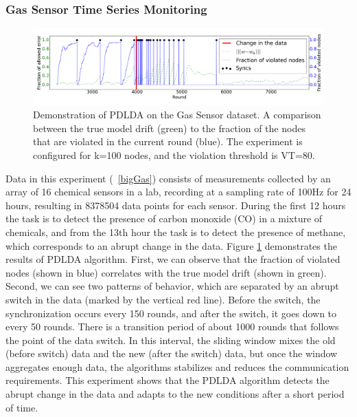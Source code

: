 \documentclass{vldb}
\begin{document}
\subsubsection{Gas Sensor Time Series Monitoring}
\begin{figure}[ht]
\centering
\includegraphics[width=\textwidth]{graphics/overTime100k.png}
\caption{Demonstration of PDLDA on the Gas Sensor dataset.
A comparison between the true model drift (green) to the fraction of the nodes that
are violated in the current round (blue).
The experiment is configured for k=100 nodes, and the violation threshold is
VT=80.}
\label{BigGasOverTime}
\end{figure}
Data in this experiment (~\ref{bigGas}) consists of measurements collected
by an array of 16 chemical sensors in a lab, recording at a sampling
rate of 100Hz for 24 hours, resulting in 8378504 data points for each sensor.
During the first 12 hours the task is to detect the presence of carbon monoxide
(CO) in a mixture of chemicals, and from the 13th hour the task is to detect the presence of methane, 
which corresponds to an abrupt change in the data.
Figure \ref{BigGasOverTime} demonstrates the results of PDLDA algorithm.
First, we can observe that the fraction of violated nodes (shown in blue) correlates with the true model drift (shown in green). Second, we can see two patterns of behavior, which are separated by an abrupt switch in the data  (marked by the vertical red line). Before the switch,  the synchronization occurs every 150 rounds, and after the switch, it goes down to every 50 rounds. There is a transition period of about 1000 rounds that follows the point of the data switch. In this interval, the sliding window mixes the old (before switch) data and the new (after the switch) data, but once the window aggregates enough data, the algorithms stabilizes and reduces the communication requirements.   This experiment shows that the PDLDA algorithm detects the abrupt change in the data and adapts to the new conditions after a short period of time.
\end{document}
